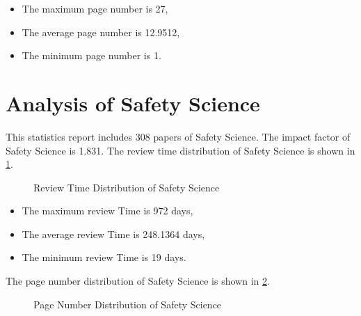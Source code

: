 \documentclass[12pt,
               a4paper,
               journal,
               onecolumn]{IEEEtran}
\begin{document}
\begin{itemize}
  \item The maximum page number is 27,
  \item The average page number is 12.9512,
  \item The minimum page number is 1.
\end{itemize}

\section{Analysis of Safety Science}
This statistics report includes 308 papers of Safety Science. The impact factor of Safety Science is 1.831. The review time distribution of Safety Science is shown in \cref{fig:Review Time Distribution of Safety Science}.
\begin{figure}[htb]
  \centering
  \caption{Review Time Distribution of Safety Science}
  \label{fig:Review Time Distribution of Safety Science}
\end{figure}

\begin{itemize}
  \item The maximum review Time is 972 days,
  \item The average review Time is 248.1364 days,
  \item The minimum review Time is 19 days.
\end{itemize}

The page number distribution of Safety Science is shown in \cref{fig:Page Number Distribution of Safety Science}.
\begin{figure}[htb]
  \centering
  \caption{Page Number Distribution of Safety Science}
  \label{fig:Page Number Distribution of Safety Science}
\end{figure}
\end{document}
